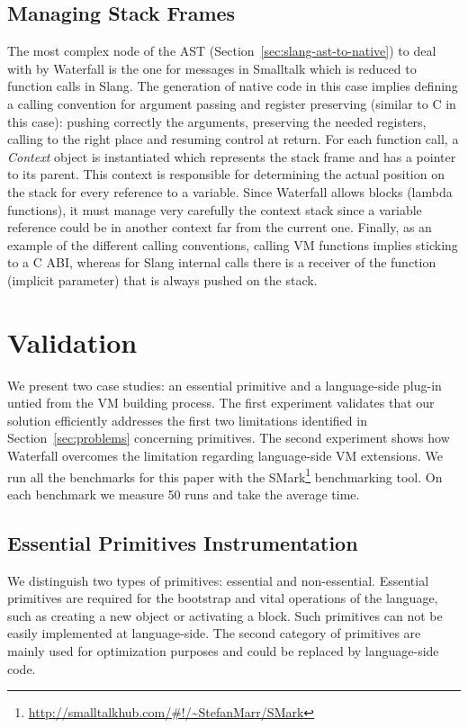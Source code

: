 \documentclass[10pt,preprint,letter]{sigplanconf}
\newcommand{\secref}  [1] {\ref{sec:#1}}
\newcommand{\ST}  {Small\-talk\xspace}
\newcommand{\W}{Waterfall\xspace}
\begin{document}
\subsection{Managing Stack Frames}
The most complex node of the AST (Section~\secref{slang-ast-to-native}) to deal with by \W is the one for messages in \ST which is reduced to function calls in Slang.
The generation of native code in this case implies defining a calling convention for argument passing and register preserving (similar to C in this case): pushing correctly the arguments, preserving the needed registers, calling to the right place and resuming control at return. 
For each function call, a \textit{Context} object is instantiated which represents the stack frame and has a pointer to its parent. 
This context is responsible for determining the actual position on the stack for every reference to a variable. Since \W allows blocks (lambda functions), it must manage very carefully the context stack since a variable reference could be in another context far from the current one.
Finally, as an example of the different calling conventions, calling VM functions implies sticking to a C ABI, whereas for Slang internal calls there is a receiver of the function (implicit parameter) that is always pushed on the stack.




\section{Validation}
We present two case studies: an essential primitive and a language-side plug-in untied from the VM building process. 
The first experiment validates that our solution efficiently addresses the first two limitations  identified in Section~\secref{problems} concerning primitives.  The second experiment shows how \W overcomes the limitation regarding language-side VM extensions. We run all the benchmarks for this paper with the SMark\footnote{\url{http://smalltalkhub.com/\#!/~StefanMarr/SMark}} benchmarking tool. On each benchmark we measure 50 runs and take the average time. 
 
\subsection{Essential Primitives Instrumentation}
We distinguish two types of primitives: essential and non-essential. 
Essential primitives are required for the bootstrap and vital operations of the language, such as creating a new object or activating a block. 
Such primitives can not be easily implemented at language-side.
The second category of primitives are mainly used for optimization purposes and could be replaced by language-side code.
\end{document}
